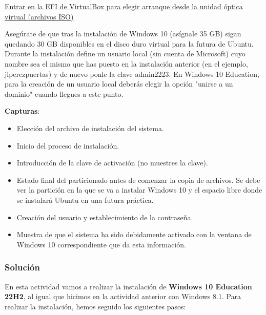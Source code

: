\href{https://www.youtube.com/watch?v=PdMtyQf2tJk&ab_channel=Crist%C3%B3balMarco}{Entrar en la EFI de VirtualBox para elegir arranque desde la unidad óptica virtual (archivos ISO)}

Asegúrate de que tras la instalación de Windows 10 (asígnale 35 GB) sigan quedando 30 GB disponibles en el disco duro virtual para la futura de Ubuntu. Durante la instalación define un usuario local (sin cuenta de Microsoft) cuyo nombre sea el mismo que has puesto en la instalación anterior (en el ejemplo, jlperezpuertas) y de nuevo ponle la clave admin2223. En Windows 10 Education, para la creación de un usuario local deberás elegir la opción "unirse a un dominio" cuando llegues a este punto.

\textbf{Capturas}:

\begin{itemize}
    \item Elección del archivo de instalación del sistema.
    \item Inicio del proceso de instalación.
    \item Introducción de la clave de activación (no muestres la clave).
    \item Estado final del particionado antes de comenzar la copia de archivos. Se debe ver la partición en la que se va a instalar Windows 10 y el espacio libre donde se instalará Ubuntu en una futura práctica.
    \item Creación del usuario y establecimiento de la contraseña.
    \item Muestra de que el sistema ha sido debidamente activado con la ventana de Windows 10 correspondiente que da esta información.
\end{itemize}

\subsubsection{Solución}
En esta actividad vamos a realizar la instalación de \textbf{Windows 10 Education 22H2}, al igual que hicimos en la actividad anterior con Windows 8.1. Para realizar la instalación, hemos seguido los siguientes pasos:

